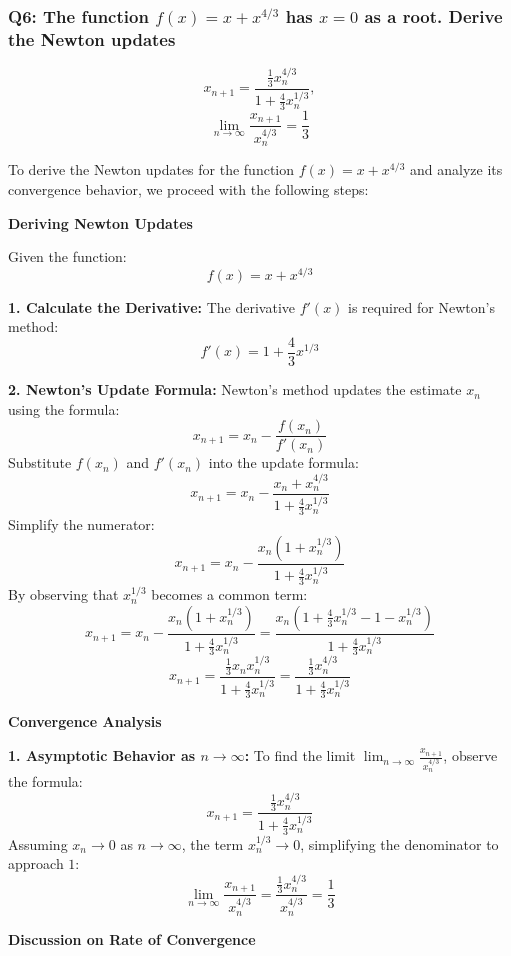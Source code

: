 \documentclass[8pt]{article}
\begin{document}
\subsubsection*{Q6: The function \(f(x) = x + x^{4/3}\) has \(x = 0\) as a root. Derive the Newton updates}
\[ x_{n+1} = \frac{\frac{1}{3} x_n^{4/3}}{1 + \frac{4}{3} x_n^{1/3}}, \]
\[ \lim_{n \to \infty} \frac{x_{n+1}}{x_n^{4/3}} = \frac{1}{3} \]

To derive the Newton updates for the function \(f(x) = x + x^{4/3}\) and analyze its convergence behavior, we proceed with the following steps:

\textbf{Deriving Newton Updates}

Given the function:
\[ f(x) = x + x^{4/3} \]

\textbf{1. Calculate the Derivative: }
   The derivative \(f'(x)\) is required for Newton's method:
   \[
   f'(x) = 1 + \frac{4}{3}x^{1/3}
   \]

\textbf{2. Newton's Update Formula:}
   Newton's method updates the estimate \(x_n\) using the formula:
   \[
   x_{n+1} = x_n - \frac{f(x_n)}{f'(x_n)}
   \]
   Substitute \(f(x_n)\) and \(f'(x_n)\) into the update formula:
   \[
   x_{n+1} = x_n - \frac{x_n + x_n^{4/3}}{1 + \frac{4}{3} x_n^{1/3}}
   \]
   Simplify the numerator:
   \[
   x_{n+1} = x_n - \frac{x_n(1 + x_n^{1/3})}{1 + \frac{4}{3} x_n^{1/3}}
   \]
   By observing that \(x_n^{1/3}\) becomes a common term:
   \[
   x_{n+1} = x_n - \frac{x_n(1 + x_n^{1/3})}{1 + \frac{4}{3} x_n^{1/3}} = \frac{x_n \left(1 + \frac{4}{3}x_n^{1/3} - 1 - x_n^{1/3}\right)}{1 + \frac{4}{3} x_n^{1/3}}
   \]
   \[
   x_{n+1} = \frac{\frac{1}{3} x_n x_n^{1/3}}{1 + \frac{4}{3} x_n^{1/3}} = \frac{\frac{1}{3} x_n^{4/3}}{1 + \frac{4}{3} x_n^{1/3}}
   \]

\textbf{Convergence Analysis}

\textbf{1. Asymptotic Behavior as \(n \to \infty\):}
   To find the limit \(\lim_{n \to \infty} \frac{x_{n+1}}{x_n^{4/3}}\), observe the formula:
   \[
   x_{n+1} = \frac{\frac{1}{3} x_n^{4/3}}{1 + \frac{4}{3} x_n^{1/3}}
   \]
   Assuming \(x_n \to 0\) as \(n \to \infty\), the term \(x_n^{1/3} \to 0\), simplifying the denominator to approach \(1\):
   \[
   \lim_{n \to \infty} \frac{x_{n+1}}{x_n^{4/3}} = \frac{\frac{1}{3} x_n^{4/3}}{x_n^{4/3}} = \frac{1}{3}
   \]

\textbf{Discussion on Rate of Convergence}
\end{document}
